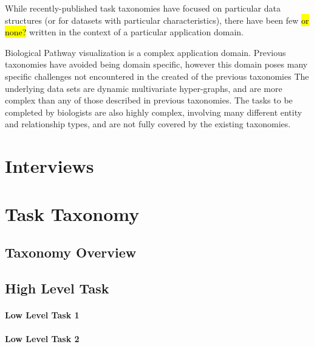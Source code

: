 \documentclass{egpubl}
\begin{document}
While recently-published task taxonomies have focused on particular data structures (or for datasets with particular characteristics), there have been few \hl{or none?} written in the context of a particular application domain.


Biological Pathway visualization is a complex application domain.
Previous taxonomies have avoided being domain specific, however this domain poses many specific challenges not encountered in the created of the previous taxonomies
The underlying data sets are dynamic multivariate hyper-graphs, and are more complex than any of those described in previous taxonomies.
The tasks to be completed by biologists are also highly complex, involving many different entity and relationship types, and are not fully covered by the existing taxonomies.




\section{Interviews}

\section{Task Taxonomy}
\subsection{Taxonomy Overview}
\subsection{High Level Task}
\paragraph{Low Level Task 1}
\paragraph{Low Level Task 2}
\end{document}
